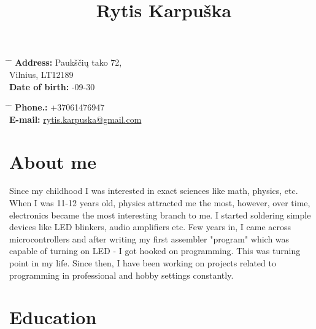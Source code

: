 \documentclass[12]{article}
\begin{document}
\title{Rytis Karpuška}


\parbox{0.5\textwidth}{ %
\begin{tabbing} %
\hspace{3cm} \= \hspace{4cm} \= \kill %
{\bf Address:} \> Paukščių tako 72,\\ %
\> Vilnius, LT12189\\ %
{\bf Date of birth:} -09-30\\ %
\end{tabbing}}
\hfill %
\parbox{0.5\textwidth}{ %
\begin{tabbing} %
\hspace{3cm} \= \hspace{4cm} \= \kill %
{\bf Phone.:} \> +37061476947 \\ %
{\bf E-mail:} \> \href{mailto:rytis.karpuska@gmail.com}{rytis.karpuska@gmail.com} \\ %
\end{tabbing}}

\section{About me}

Since my childhood I was interested in exact sciences like math, physics, etc.
When I was 11-12 years old, physics attracted me the most, however, over time, electronics became the most interesting branch to me.
I started soldering simple devices like LED blinkers, audio amplifiers etc.
Few years in, I came across microcontrollers and after writing my first assembler "program" which was capable of turning on LED - I got hooked on programming.
This was turning point in my life.
Since then, I have been working on projects related to programming in professional and hobby settings constantly.

\section{Education}

\end{document}
